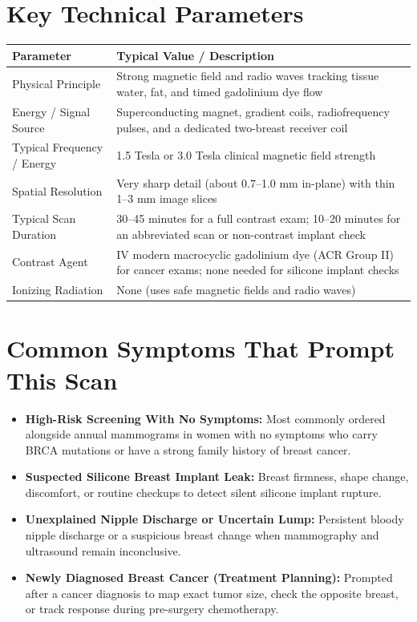 \section{Key Technical Parameters}
\noindent
\begin{tabularx}{\textwidth}{@{}l X@{}}
\toprule
\textbf{Parameter} & \textbf{Typical Value / Description} \\
\midrule
Physical Principle & Strong magnetic field and radio waves tracking tissue water, fat, and timed gadolinium dye flow \\
Energy / Signal Source & Superconducting magnet, gradient coils, radiofrequency pulses, and a dedicated two-breast receiver coil \\
Typical Frequency / Energy & 1.5 Tesla or 3.0 Tesla clinical magnetic field strength \\
Spatial Resolution & Very sharp detail (about 0.7--1.0 mm in-plane) with thin 1--3 mm image slices \\
Typical Scan Duration & 30--45 minutes for a full contrast exam; 10--20 minutes for an abbreviated scan or non-contrast implant check \\
Contrast Agent & IV modern macrocyclic gadolinium dye (ACR Group II) for cancer exams; none needed for silicone implant checks \\
Ionizing Radiation & None (uses safe magnetic fields and radio waves) \\
\bottomrule
\end{tabularx}

\section{Common Symptoms That Prompt This Scan}
\begin{itemize}
\item \textbf{High-Risk Screening With No Symptoms:} Most commonly ordered alongside annual mammograms in women with no symptoms who carry BRCA mutations or have a strong family history of breast cancer.
\item \textbf{Suspected Silicone Breast Implant Leak:} Breast firmness, shape change, discomfort, or routine checkups to detect silent silicone implant rupture.
\item \textbf{Unexplained Nipple Discharge or Uncertain Lump:} Persistent bloody nipple discharge or a suspicious breast change when mammography and ultrasound remain inconclusive.
\item \textbf{Newly Diagnosed Breast Cancer (Treatment Planning):} Prompted after a cancer diagnosis to map exact tumor size, check the opposite breast, or track response during pre-surgery chemotherapy.
\end{itemize}

